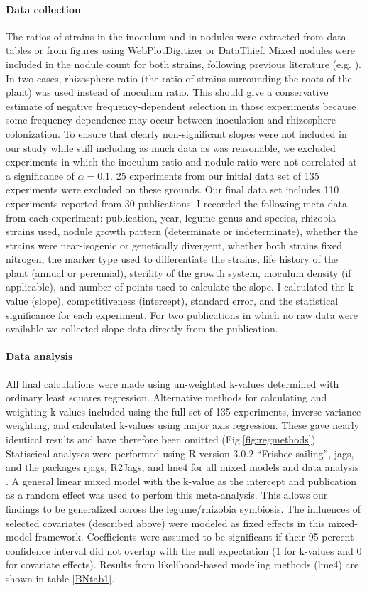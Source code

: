 \documentclass[12pt]{article}
\begin{document}
\begin{doublespace}
\paragraph{Data collection} 
The ratios of strains in the inoculum and in nodules were extracted from data tables or from figures using WebPlotDigitizer or DataThief. Mixed nodules were included in the nodule count for both strains, following previous literature (e.g. \cite{Beattie1989}). In two cases, rhizosphere ratio (the ratio of strains surrounding the roots of the plant) was used instead of inoculum ratio. This should give a conservative estimate of negative frequency-dependent selection in those experiments because some frequency dependence may occur between inoculation and rhizosphere colonization. To ensure that clearly non-significant slopes were not included in our study while still including as much data as was reasonable, we excluded experiments in which the inoculum ratio and nodule ratio were not correlated at a significance of $\alpha=0.1$. 25 experiments from our initial data set of 135 experiments were excluded on these grounds. Our final data set includes 110 experiments reported from 30 publications. I recorded the following meta-data from each experiment: publication, year, legume genus and species, rhizobia strains used, nodule growth pattern (determinate or indeterminate), whether the strains were near-isogenic or genetically divergent, whether both strains fixed nitrogen, the marker type used to differentiate the strains, life history of the plant (annual or perennial), sterility of the growth system, inoculum density (if applicable), and number of points used to calculate the slope. I calculated the k-value (slope), competitiveness (intercept), standard error, and the statistical significance for each experiment. For two publications in which no raw data were available we collected slope data directly from the publication.
\paragraph{Data analysis}
All final calculations were made using un-weighted k-values determined with ordinary least squares regression. Alternative methods for calculating and weighting k-values included using the full set of 135 experiments, inverse-variance weighting, and calculated k-values using major axis regression. These gave nearly identical results and have therefore been omitted (Fig.\ref{fig:regmethods}). Statiscical analyses were performed using R version 3.0.2 “Frisbee sailing”, jags, and the packages rjags, R2Jags, and lme4 for all mixed models and data analysis \cite{RCoreteam2015}. A general linear mixed model with the k-value as the intercept and publication as a random effect was used to perfom this meta-analysis. This allows our findings to be generalized across the legume/rhizobia symbiosis. The influences of selected covariates (described above) were modeled as fixed effects in this mixed-model framework. Coefficients were assumed to be significant if their 95 percent confidence interval did not overlap with the null expectation (1 for k-values and 0 for covariate effects). Results from likelihood-based modeling methods (lme4) are shown in table \ref{BNtab1}.


\end{doublespace}
\end{document}
